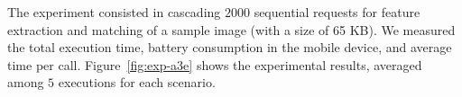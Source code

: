 The experiment consisted in cascading $2000$ sequential requests for feature extraction and matching of a sample image (with a size of 65 KB). We measured the total execution time, battery consumption in the mobile device, and average time per call. Figure~\ref{fig:exp-a3e} shows the experimental results, averaged among $5$ executions for each scenario.

